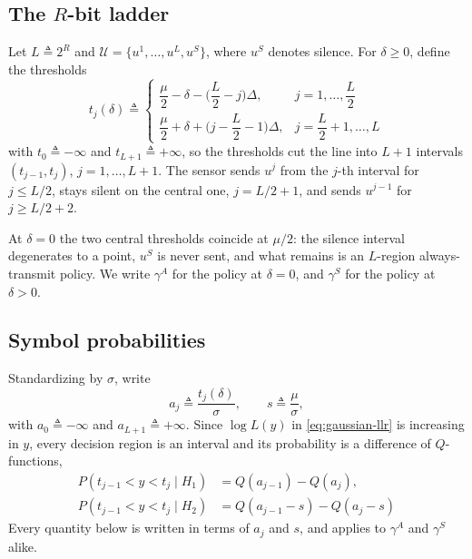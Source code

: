 \documentclass[conference]{IEEEtran}
\newcommand{\Qfun}{Q}
\begin{document}
\subsection{The $R$-bit ladder}
Let $L\triangleq2^R$ and $\mathcal{U}=\{u^1,\dots,u^L,u^S\}$, where $u^S$
denotes silence.  For $\delta\ge0$, define the thresholds
\begin{equation}
 t_j(\delta)\triangleq
 \begin{cases}
  \dfrac{\mu}{2}-\delta-\Big(\dfrac{L}{2}-j\Big)\Delta,
    & j=1,\dots,\dfrac{L}{2}\\[2mm]
  \dfrac{\mu}{2}+\delta+\Big(j-\dfrac{L}{2}-1\Big)\Delta,
    & j=\dfrac{L}{2}+1,\dots,L
 \end{cases}
 \label{eq:general-thresholds}
\end{equation}
with $t_0\triangleq-\infty$ and $t_{L+1}\triangleq+\infty$, so the
thresholds cut the line into $L+1$ intervals $(t_{j-1},t_j)$,
$j=1,\dots,L+1$.  The sensor sends $u^j$ from the $j$-th interval for
$j\le L/2$, stays silent on the central one, $j=L/2+1$, and sends
$u^{j-1}$ for $j\ge L/2+2$.

At $\delta=0$ the two central thresholds coincide at $\mu/2$: the silence
interval degenerates to a point, $u^S$ is never sent, and what remains is
an $L$-region always-transmit policy.  We write $\gamma^A$ for the policy
at $\delta=0$, and $\gamma^S$ for the policy at $\delta>0$.

\subsection{Symbol probabilities}
Standardizing by $\sigma$, write
\begin{equation*}
 a_j\triangleq\frac{t_j(\delta)}{\sigma},\qquad
 s\triangleq\frac{\mu}{\sigma},
\end{equation*}
with $a_0\triangleq-\infty$ and $a_{L+1}\triangleq+\infty$.  Since
$\log L(y)$ in \eqref{eq:gaussian-llr} is increasing in $y$, every
decision region is an interval and its probability is a difference of
$Q$-functions,
\begin{align*}
 P(t_{j-1}<y<t_j\mid H_1)&=\Qfun(a_{j-1})-\Qfun(a_j),\\
 P(t_{j-1}<y<t_j\mid H_2)&=\Qfun(a_{j-1}-s)-\Qfun(a_j-s)
\end{align*}
Every quantity below is written in terms of $a_j$ and $s$, and applies to
$\gamma^A$ and $\gamma^S$ alike.
\end{document}
